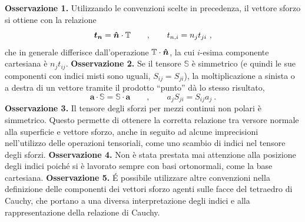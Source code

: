 %
\newline \noindent
\textbf{Osservazione 1.} Utilizzando le convenzioni scelte in precedenza, il vettore sforzo si ottiene con la relazione
\begin{equation}
 \bm{t_n} = \bm{\hat{n}} \cdot \mathbb{T} \qquad , \qquad t_{n,i} = n_j t_{ji} \ ,
\end{equation}
che in generale differisce dall'operazione $\mathbb{T} \cdot \bm{\hat{n}}$, la cui $i$-esima componente cartesiana è $n_j t_{ij}$.
%
\newline \noindent
\textbf{Osservazione 2.} Se il tensore $\mathbb{S}$ è simmetrico (e quindi le sue componenti con indici misti sono uguali, $S_{ij} = S_{ji}$), la moltiplicazione a sinista o a destra di un vettore tramite il prodotto ``punto'' dà lo stesso risultato,
\begin{equation}
 \bm{a} \cdot \mathbb{S} = \mathbb{S} \cdot \bm{a} \qquad , \qquad 
 a_j S_{ji} = S_{ij} a_j \ .
\end{equation}
%
\newline \noindent
\textbf{Osservazione 3.} Il tensore degli sforzi per mezzi continui non polari è simmetrico. Questo permette di ottenere la corretta relazione tra versore normale alla superficie e vettore sforzo, anche in seguito ad alcune imprecisioni nell'utilizzo delle operazioni tensoriali, come uno scambio di indici nel tensore degli sforzi.
%
\newline \noindent
\textbf{Osservazione 4.} Non è stata prestata mai attenzione alla posizione degli indici poiché si è lavorato sempre con basi ortonormali, come la base cartesiana.
%
\newline \noindent
\textbf{Osservazione 5.} \'E possibile utilizzare altre convenzioni nella definizione delle componenti dei vettori sforzo agenti sulle facce del tetraedro di Cauchy, che portano a una diversa interpretazione degli indici e alla rappresentazione della relazione di Cauchy.


